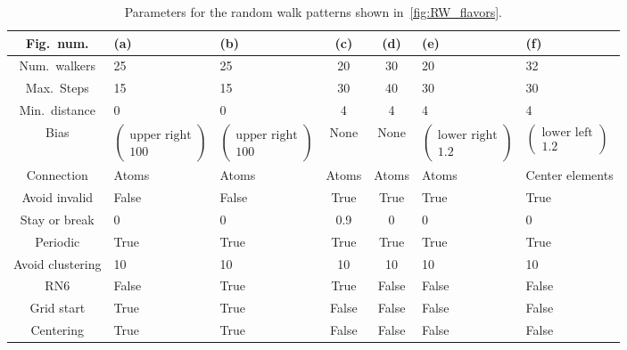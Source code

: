 \begin{table}[h]
  \begin{center}
  \caption{Parameters for the random walk patterns shown in~\cref{fig:RW_flavors}.}
  \label{tab:RW_flavors}
  \begin{tabular}{ |c|M{2.2cm}|M{2.2cm}|c|c|M{2.2cm}|M{2.2cm}|} \hline
  Fig.\ num. & (a) & (b) & (c) & (d) & (e) & (f) \\ \hline 
  Num.\ walkers & 25 & 25 & 20 & 30 & 20 & 32 \\ \hline 
  Max.\ Steps & 15 & 15 & 30 & 40 & 30 & 30 \\ \hline 
  Min.\ distance & 0 & 0 & 4 & 4 & 4 & 4 \\ \hline 
  Bias & $\begin{pmatrix} \text{upper right} \\ 100 \end{pmatrix}$ & $\begin{pmatrix} \text{upper right} \\ 100 \end{pmatrix}$ & None & None & $\begin{pmatrix} \text{lower right} \\ 1.2 \end{pmatrix}$ & $\begin{pmatrix} \text{lower left} \\ 1.2 \end{pmatrix}$ \\ \hline 
  Connection & Atoms & Atoms & Atoms & Atoms & Atoms & Center elements \\ \hline  
  Avoid invalid & False & False & True & True & True & True \\ \hline  
  Stay or break & 0 & 0 & 0.9 & 0 & 0 & 0 \\ \hline  
  Periodic & True & True & True & True & True & True \\ \hline  
  Avoid clustering & 10 & 10 & 10 & 10 & 10 & 10 \\ \hline  
  RN6 & False & True & True & False & False & False \\ \hline 
  Grid start & True & True & False & False & False & False \\ \hline 
  Centering & True & True & False & False & False & False \\ \hline 
  \end{tabular}
\end{center}
\end{table}


